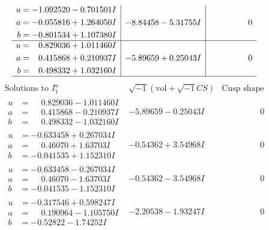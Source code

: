 \documentclass[1p]{elsarticle_modified}
\theoremstyle{definition}
\newcommand{\I}{\sqrt{-1}}
\begin{document}
$$\begin{array}{c|c|c}
\begin{aligned}
u &= -1.092520 - 0.701501 I \\
a &= -0.055816 + 1.264050 I \\
b &= -0.801534 + 1.107380 I\end{aligned}
 & -8.84458 - 5.31755 I & \phantom{-0.000000 } 0 \\ \hline\begin{aligned}
u &= \phantom{-}0.829036 + 1.011460 I \\
a &= \phantom{-}0.415868 + 0.210937 I \\
b &= \phantom{-}0.498332 + 1.032160 I\end{aligned}
 & -5.89659 + 0.25043 I & \phantom{-0.000000 } 0\\
 \hline 
 \end{array}$$\newpage$$\begin{array}{c|c|c}  
\text{Solutions to }I^u_{1}& \I (\text{vol} + \sqrt{-1}CS) & \text{Cusp shape}\\
 \hline 
\begin{aligned}
u &= \phantom{-}0.829036 - 1.011460 I \\
a &= \phantom{-}0.415868 - 0.210937 I \\
b &= \phantom{-}0.498332 - 1.032160 I\end{aligned}
 & -5.89659 - 0.25043 I & \phantom{-0.000000 } 0 \\ \hline\begin{aligned}
u &= -0.633458 + 0.267034 I \\
a &= \phantom{-}0.46070 + 1.63703 I \\
b &= -0.041535 + 1.152310 I\end{aligned}
 & -0.54362 + 3.54968 I & \phantom{-0.000000 } 0 \\ \hline\begin{aligned}
u &= -0.633458 - 0.267034 I \\
a &= \phantom{-}0.46070 - 1.63703 I \\
b &= -0.041535 - 1.152310 I\end{aligned}
 & -0.54362 - 3.54968 I & \phantom{-0.000000 } 0 \\ \hline\begin{aligned}
u &= -0.317546 + 0.598247 I \\
a &= \phantom{-}0.190964 - 1.105750 I \\
b &= -0.52822 - 1.74252 I\end{aligned}
 & -2.20538 - 1.93247 I & \phantom{-0.000000 } 0 \\ \hline\begin{aligned}

\end{aligned}
\end{array}$$
\end{document}
